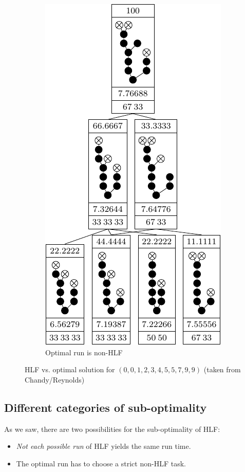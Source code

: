 \begin{figure}[ht]
\begin{subfigure}{.45\linewidth}
    \includegraphics{p3/hlf_not_optimal/00123455799_opt.pdf}
    \caption{Optimal run is non-HLF}
  \end{subfigure}
  \caption{HLF vs. optimal solution for $(0,0,1,2,3,4,5,5,7,9,9)$ (taken from Chandy/Reynolds)}
  \label{fig:hlf-vs-opt-00123455799}
\end{figure}

\subsection{Different categories of sub-optimality}
\label{sec:hlf-suboptimal-two-variants}

As we saw, there are two possibilities for the sub-optimality of HLF:

\begin{itemize}
\item \emph{Not each possible run} of HLF yields the same run time.
\item The optimal run has to choose a strict non-HLF task.
\end{itemize}

